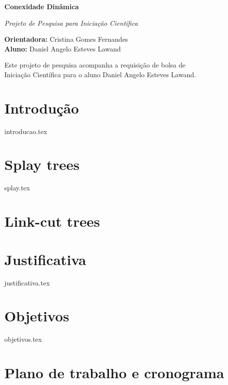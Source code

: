 \documentclass[12pt]{article}
\begin{document}
\begin{center}

{\Large {\bf Conexidade Dinâmica}} 

{\large {\em Projeto de Pesquisa para Iniciação Científica}

}

\vspace{0.2cm}
{\small 
{\bf Orientadora:} Cristina Gomes Fernandes \\
{\bf Aluno:} Daniel Angelo Esteves Lawand
}

\vspace{5mm} 

{\small Este projeto de pesquisa acompanha a requisição de bolsa de \\ 
  Iniciação Científica para o aluno Daniel Angelo Esteves Lawand.}

\end{center}

\section{Introdução}  
{introducao.tex}

\section{Splay trees}  
{splay.tex}

\section{Link-cut trees}  

\section{Justificativa}  
{justificativa.tex}

\section{Objetivos}  
{objetivos.tex}


\section{Plano de trabalho e cronograma}  
\end{document}

